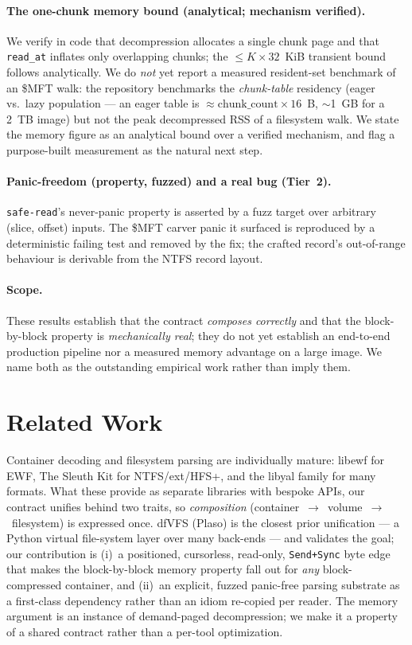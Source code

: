 \documentclass[10pt,twocolumn]{article}
\begin{document}
\paragraph{The one-chunk memory bound (analytical; mechanism verified).}
We verify in code that decompression allocates a single chunk page and that
\texttt{read\_at} inflates only overlapping chunks; the $\le K\times 32$~KiB
transient bound follows analytically. We do \emph{not} yet report a measured
resident-set benchmark of an \$MFT walk: the repository benchmarks the
\emph{chunk-table} residency (eager vs.\ lazy population --- an eager table is
$\approx\!\text{chunk\_count}\times 16$~B, $\sim$1~GB for a 2~TB image) but not
the peak decompressed RSS of a filesystem walk. We state the memory figure as an
analytical bound over a verified mechanism, and flag a purpose-built measurement
as the natural next step.

\paragraph{Panic-freedom (property, fuzzed) and a real bug (Tier~2).}
\texttt{safe-read}'s never-panic property is asserted by a fuzz target over
arbitrary (slice, offset) inputs. The \$MFT carver panic it surfaced is
reproduced by a deterministic failing test and removed by the fix; the crafted
record's out-of-range behaviour is derivable from the NTFS record layout.

\paragraph{Scope.}
These results establish that the contract \emph{composes correctly} and that the
block-by-block property is \emph{mechanically real}; they do not yet establish an
end-to-end production pipeline nor a measured memory advantage on a large image.
We name both as the outstanding empirical work rather than imply them.

\section{Related Work}\label{sec:related}

Container decoding and filesystem parsing are individually mature: libewf
\citep{libewf} for EWF, The Sleuth Kit \citep{tsk} for NTFS/ext/HFS+, and the
libyal family for many formats. What these provide as separate libraries with
bespoke APIs, our contract unifies behind two traits, so \emph{composition}
(container~$\to$~volume~$\to$~filesystem) is expressed once. dfVFS
\citep{dfvfs} (Plaso) is the closest prior unification --- a Python virtual
file-system layer over many back-ends --- and validates the goal; our contribution
is (i)~a positioned, cursorless, read-only, \texttt{Send+Sync} byte edge that
makes the block-by-block memory property fall out for \emph{any} block-compressed
container, and (ii)~an explicit, fuzzed panic-free parsing substrate as a
first-class dependency rather than an idiom re-copied per reader. The memory
argument is an instance of demand-paged decompression; we make it a property of a
shared contract rather than a per-tool optimization.
\end{document}
